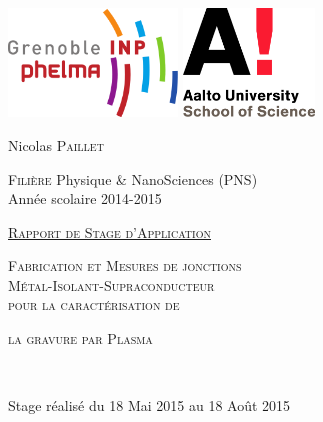 \documentclass[a4paper,12pt]{report}
\begin{document}
\begin{titlepage}
    \begin{center}
        \includegraphics[width=45mm]{logo_phelma.png}
        \hfill
        \includegraphics[width=35mm]{logo_aalto.png}
        \vspace{1.2cm}
        
        {\LARGE Nicolas \textsc{Paillet}}\\
        \vspace{0.5cm}
        
        \textsc{Filière} Physique \& NanoSciences (PNS)\\
        Année scolaire 2014-2015\\
        \vspace{1cm}
        
        {\Large \textsc{\underline{Rapport de Stage d'Application}}}
        \vspace{0.4cm}
        
        {\LARGE \textsc{Fabrication et Mesures de jonctions}\\
        \textsc{Métal-Isolant-Supraconducteur}\\
        \textsc{pour la caractérisation de}\\
        \vspace{0.3cm}
        
        \textsc{la gravure par Plasma}}\\
        
        \vspace{1.3cm}
        
        Stage réalisé du 18 Mai 2015 au 18 Août 2015\\
        
    \vspace{0.3cm}
    

\end{center}
\end{titlepage}
\end{document}
